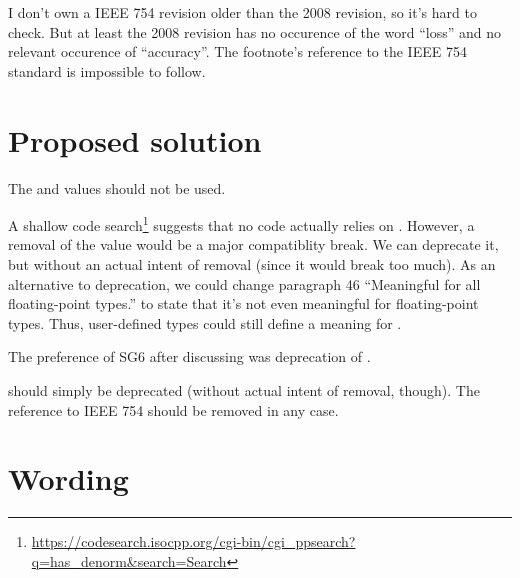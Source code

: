 I don't own a IEEE 754 revision older than the 2008 revision, so it's hard to check. But 
at least the 2008 revision has no occurence of the word “loss” and no relevant occurence 
of “accuracy”. The footnote's reference to the IEEE 754 standard is impossible to follow.

\section{Proposed solution}

The  and  values should not be used.

A shallow code 
search\footnote{\url{https://codesearch.isocpp.org/cgi-bin/cgi_ppsearch?q=has_denorm&search=Search}} 
suggests that no code actually relies on . However, a removal of the 
value would be a major compatiblity break. We can deprecate it, but without an actual 
intent of removal (since it would break too much). As an alternative to deprecation, we 
could change paragraph 46 “Meaningful for all floating-point types.” to state that it's 
not even meaningful for floating-point types. Thus, user-defined types could still define 
a meaning for .

The preference of SG6 after discussing \cite{WG14N2993} was deprecation of 
.

 should simply be deprecated (without actual intent of removal, 
though). The reference to IEEE 754 should be removed in any case.

\section{Wording}




